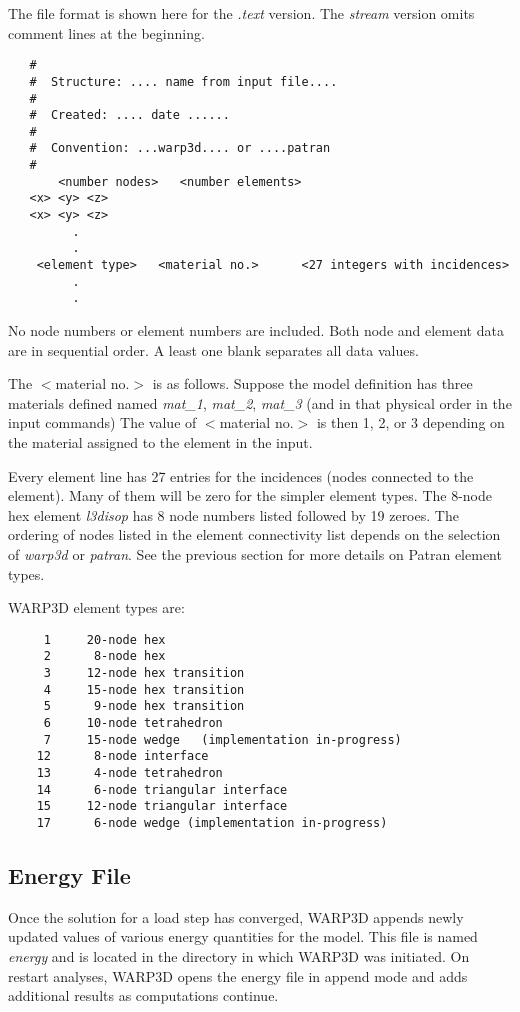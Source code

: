\documentclass[11pt]{report}
\numberwithin{equation}{section}
\newcommand{\nin} {\noindent}
\newcommand{\ti}{\emph}
\begin{document}
The file format is shown here for the \ti{.text} version. The \ti{stream}  version omits
comment lines at the beginning.
\small
\begin{verbatim}
   #
   #  Structure: .... name from input file....
   #
   #  Created: .... date ......
   #
   #  Convention: ...warp3d.... or ....patran   
   #
       <number nodes>   <number elements>
   <x> <y> <z> 
   <x> <y> <z>
         .
         .
    <element type>   <material no.>      <27 integers with incidences>
         .
         .
\end{verbatim}
\normalsize
\nin No node numbers or element numbers are included. Both node and element data
are in sequential order.    
A least one blank separates all data values. 

The $<$material no.$>$  is as follows. Suppose the model definition has three
materials defined named \ti{mat\_1}, \ti{mat\_2}, \ti{mat\_3} (and in that
physical order in the input commands) The value of  $<$material no.$>$ is then 1, 2, 
or 3 depending on the material assigned to the element in the input.

Every element line has 27 entries for the incidences (nodes connected to the element).
Many of them will be zero for the simpler element types. The 8-node hex element 
\ti{l3disop} has 8
node numbers listed followed by 19 zeroes. The ordering of nodes listed in the element
connectivity list depends on the selection of \ti{warp3d} or \ti{patran}. See the previous section
for more details on Patran element types.

WARP3D element types are:
\small
\begin{verbatim}
     1     20-node hex
     2      8-node hex
     3     12-node hex transition
     4     15-node hex transition
     5      9-node hex transition
     6     10-node tetrahedron
     7     15-node wedge   (implementation in-progress)
    12      8-node interface
    13      4-node tetrahedron
    14      6-node triangular interface
    15     12-node triangular interface
    17      6-node wedge (implementation in-progress)
\end{verbatim}
\normalsize

\subsection{Energy File}
\nin Once the solution for a load step has converged, WARP3D appends newly updated values
of various energy quantities for the model. This file is named \ti{energy} and is
located in the directory in which WARP3D was initiated. On restart analyses, WARP3D opens
the energy file in append mode and adds additional results as computations continue.
\end{document}
